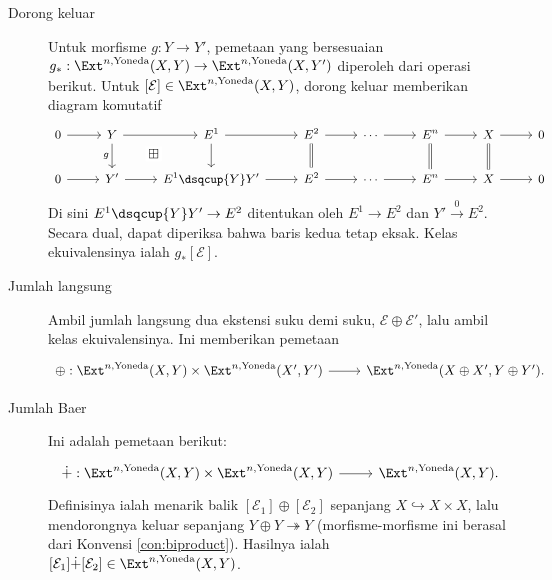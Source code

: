 \begin{description}
	\item[Dorong keluar] Untuk morfisme $g: Y \to Y'$, pemetaan yang
	bersesuaian
	$g_*: \Ext^{n, \text{Yoneda}}(X, Y) \to
	\Ext^{n, \text{Yoneda}}(X, Y')$ diperoleh dari operasi berikut. Untuk
	$[\mathcal{E}] \in \Ext^{n, \text{Yoneda}}(X, Y)$, dorong keluar
	memberikan diagram komutatif
	\[\begin{tikzcd}[every cell/.append style={font=\small}]
		0 \arrow[r] & Y \arrow[r] \arrow[d, "g"'] \arrow[phantom, rd, "\boxplus" description] & E^1 \arrow[r] \arrow[d] & E^2 \arrow[r] \arrow[equal, d] & \cdots \arrow[r] & E^n \arrow[equal, d] \arrow[r] & X \arrow[equal, d] \arrow[r] & 0 \\
		0 \arrow[r] & Y' \arrow[r] & E^1 \dsqcup{Y} Y' \arrow[r] & E^2 \arrow[r] & \cdots \arrow[r] & E^n \arrow[r] & X \arrow[r] & 0
	\end{tikzcd}\]
	Di sini $E^1 \dsqcup{Y} Y' \to E^2$ ditentukan oleh $E^1 \to E^2$ dan
	$Y' \xrightarrow{0} E^2$. Secara dual, dapat diperiksa bahwa baris kedua
	tetap eksak. Kelas ekuivalensinya ialah $g_* [\mathcal{E}]$.
	
	\item[Jumlah langsung] Ambil jumlah langsung dua ekstensi suku demi suku,
	$\mathcal{E} \oplus \mathcal{E}'$, lalu ambil kelas ekuivalensinya. Ini
	memberikan pemetaan
	\[\begin{tikzcd}
		\oplus: \Ext^{n, \text{Yoneda}}(X, Y) \times \Ext^{n, \text{Yoneda}}(X', Y') \arrow[r] & \Ext^{n, \text{Yoneda}}(X \oplus X', Y \oplus Y') .
	\end{tikzcd}\]
	
	\item[Jumlah Baer] Ini adalah pemetaan berikut:
	\[\begin{tikzcd}
		\dot{+}: \Ext^{n, \text{Yoneda}}(X, Y) \times \Ext^{n, \text{Yoneda}}(X, Y) \arrow[r] & \Ext^{n, \text{Yoneda}}(X, Y).
	\end{tikzcd}\]
	Definisinya ialah menarik balik
	$[\mathcal{E}_1] \oplus [\mathcal{E}_2]$ sepanjang
	$X \hookrightarrow X \times X$, lalu mendorongnya keluar sepanjang
	$Y \oplus Y \twoheadrightarrow Y$ (morfisme-morfisme ini berasal dari
	Konvensi \ref{con:biproduct}). Hasilnya ialah
	$[\mathcal{E}_1] \dot{+} [\mathcal{E}_2] \in
	\Ext^{n, \text{Yoneda}}(X, Y)$.
\end{description}

